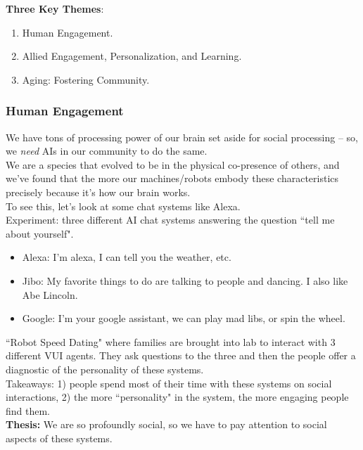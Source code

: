 {\bf Three Key Themes}:
\begin{enumerate}
    \item Human Engagement.
    \item Allied Engagement, Personalization, and Learning.
    \item Aging: Fostering Community.

\end{enumerate}

\subsubsection{Human Engagement}

We have tons of processing power of our brain set aside for social processing -- so, we {\it need} AIs in our community to do the same. \\

We are a species that evolved to be in the physical co-presence of others, and we've found that the more our machines/robots embody these characteristics precisely because it's how our brain works. \\

To see this, let's look at some chat systems like Alexa. \\

Experiment: three different AI chat systems answering the question ``tell me about yourself".
\begin{itemize}
    \item Alexa:  I'm alexa, I can tell you the weather, etc.
    \item Jibo: My favorite things to do are talking to people and dancing. I also like Abe Lincoln.
    \item Google: I'm your google assistant, we can play mad libs, or spin the wheel.
\end{itemize}

``Robot Speed Dating" where families are brought into lab to interact with 3 different VUI agents. They ask questions to the three and then the people offer a diagnostic of the personality of these systems. \\

Takeaways: 1) people spend most of their time with these systems on social interactions, 2) the more ``personality" in the system, the more engaging people find them. \\

{\bf Thesis:} We are so profoundly social, so we have to pay attention to social aspects of these systems. \\

